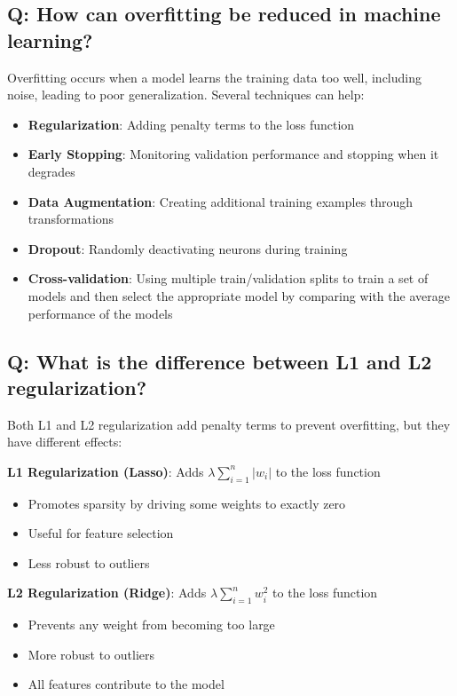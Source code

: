 \subsection*{\textcolor{primaryteal}{Q: How can overfitting be reduced in machine learning?}}
Overfitting occurs when a model learns the training data too well, including noise, leading to poor generalization. Several techniques can help:

\begin{itemize}
	\item \textbf{Regularization}: Adding penalty terms to the loss function
	\item \textbf{Early Stopping}: Monitoring validation performance and stopping when it degrades
	\item \textbf{Data Augmentation}: Creating additional training examples through transformations
	\item \textbf{Dropout}: Randomly deactivating neurons during training
	\item \textbf{Cross-validation}: Using multiple train/validation splits to train a set of models and then select the appropriate model by comparing with the average performance of the models
\end{itemize}

\subsection*{\textcolor{primaryteal}{Q: What is the difference between L1 and L2 regularization?}}
Both L1 and L2 regularization add penalty terms to prevent overfitting, but they have different effects:

\textbf{L1 Regularization (Lasso)}: Adds $\lambda \sum_{i=1}^{n} |w_i|$ to the loss function
\begin{itemize}
	\item Promotes sparsity by driving some weights to exactly zero
	\item Useful for feature selection
	\item Less robust to outliers
\end{itemize}

\textbf{L2 Regularization (Ridge)}: Adds $\lambda \sum_{i=1}^{n} w_i^2$ to the loss function
\begin{itemize}
	\item Prevents any weight from becoming too large
	\item More robust to outliers
	\item All features contribute to the model
\end{itemize}

